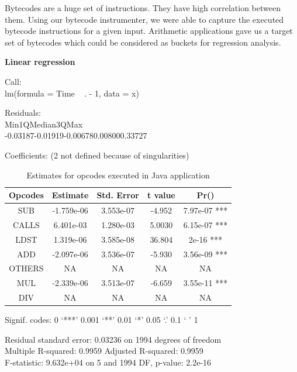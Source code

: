 \documentclass[11pt]{article}
\begin{document}
Bytecodes are a huge set of instructions. They have high correlation between them. Using our bytecode instrumenter, we were able to capture the executed bytecode instructions for a given input. Arithmetic applications gave us a target set of bytecodes which could be considered as buckets for regression analysis.\citep{bytecodetiming}

\textbf{Linear regression}

Call:\\
lm(formula = Time ~ . - 1, data = x)

Residuals:\\
Min\hspace{4em}1Q\hspace{4em}Median\hspace{3em}3Q\hspace{4em}Max \\
-0.03187\hspace{2em}-0.01919\hspace{2em}-0.00678\hspace{2em}0.00800\hspace{2em}0.33727 

Coefficients: (2 not defined because of singularities)\\

\begin{table}[h!]
\begin{center}
 \begin{tabular}{ |c|c|c|c|c| }
 \hline
 Opcodes&Estimate&Std. Error&t value&Pr()    \\
 \hline
 SUB&-1.759e-06&3.553e-07&-4.952&7.97e-07 ***\\
 CALLS&6.401e-03&1.280e-03&5.0030&6.15e-07 ***\\
 LDST&1.319e-06&3.585e-08&36.804&2e-16 ***\\
 ADD&-2.097e-06&3.536e-07&-5.930&3.56e-09 ***\\
 OTHERS&NA&NA&NA&NA\\
 MUL&-2.339e-06&3.513e-07&-6.659&3.55e-11 ***\\
 DIV&NA&NA&NA&NA\\ 
 \hline
 \end{tabular}
\end{center}
\caption{Estimates for opcodes executed in Java application}
\label{Linear Regression results:1}
\end{table}

Signif. codes:  0 ‘***’ 0.001 ‘**’ 0.01 ‘*’ 0.05 ‘.’ 0.1 ‘ ’ 1

Residual standard error: 0.03236 on 1994 degrees of freedom\\
Multiple R-squared:  0.9959 \hspace{2em} Adjusted R-squared:  0.9959 \\
F-statistic: 9.632e+04 on 5 and 1994 DF,  p-value: 2.2e-16\\
\end{document}
